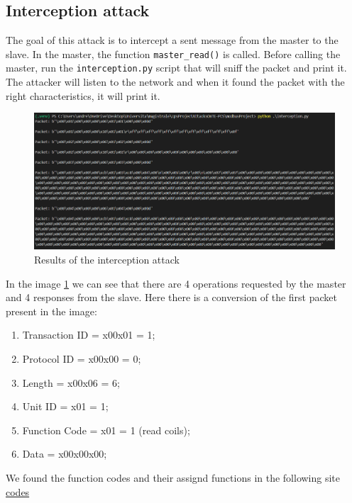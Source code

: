 \documentclass[12pt]{article}
\begin{document}
\subsection{Interception attack}
The goal of this attack is to intercept a sent message from the master to the slave. In the master, the function \texttt{master\_read()} is called. Before calling the master, run the \texttt{interception.py} script that will sniff the packet and print it. The attacker will listen to the network and when it found the packet with the right characteristics, it will print it.
\begin{figure}[h]
    \centering
    \includegraphics[width=1\textwidth]{images/InterceptionResults.png}
    \caption{Results of the interception attack}
    \label{fig:interceptionResult}
\end{figure}
In the image \ref{fig:interceptionResult} we can see that there are 4 operations requested by the master and 4 responses from the slave.
Here there is a conversion of the first packet present in the image:
\begin{enumerate}
    \item Transaction ID = x00x01 = 1;
    \item Protocol ID = x00x00 = 0;
    \item Length = x00x06 = 6;
    \item Unit ID = x01 = 1;
    \item Function Code = x01 = 1 (read coils);
    \item Data = x00x00x00;
\end{enumerate}
We found the function codes and their assignd functions in the following site \href{https://ozeki.hu/p_5873-modbus-function-codes.html}{codes}
\end{document}

